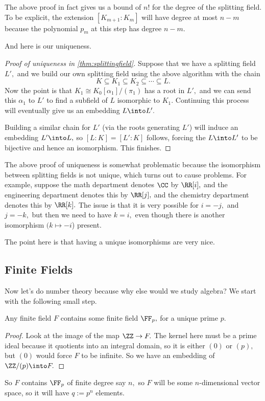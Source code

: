 \documentclass[../notes.tex]{subfiles}
\begin{document}
\begin{remark}
	The above proof in fact gives us a bound of $n!$ for the degree of the splitting field. To be explicit, the extension $[K_{m+1}:K_m]$ will have degree at most $n-m$ because the polynomial $p_m$ at this step has degree $n-m.$
\end{remark}
And here is our uniqueness.
\begin{proof}[Proof of uniqueness in \autoref{thm:splittingfield}]
	Suppose that we have a splitting field $L',$ and we build our own splitting field using the above algorithm with the chain
	\[K\subseteq K_1\subseteq K_2\subseteq\cdots\subseteq L.\]
	Now the point is that $K_1\cong K_0[\alpha_1]/(\pi_1)$ has a root in $L',$ and we can send this $\alpha_1$ to $L'$ to find a subfield of $L$ isomorphic to $K_1.$ Continuing this process will eventually give us an embedding $L\into L'.$
	
	Building a similar chain for $L'$ (via the roots generating $L'$) will induce an embedding $L'\into L,$ so $[L:K]=[L':K]$ follows, forcing the $L\into L'$ to be bijective and hence an isomorphism. This finishes.
\end{proof}
\begin{remark}
	The above proof of uniqueness is somewhat problematic because the isomorphism between splitting fields is not unique, which turns out to cause problems. For example, suppose the math department denotes $\CC$ by $\RR[i],$ and the engineering department denotes this by $\RR[j],$ and the chemistry department denotes this by $\RR[k].$ The issue is that it is very possible for $i=-j,$ and $j=-k,$ but then we need to have $k=i,$ even though there is another isomorphism $(k\mapsto-i$) present.
\end{remark}
\begin{remark}
	The point here is that having a unique isomorphisms are very nice.
\end{remark}

\subsection{Finite Fields}
Now let's do number theory because why else would we study algebra? We start with the following small step.
\begin{proposition}
	Any finite field $F$ contains some finite field $\FF_p,$ for a unique prime $p.$
\end{proposition}
\begin{proof}
	Look at the image of the map $\ZZ\to F.$ The kernel here must be a prime ideal because it quotients into an integral domain, so it is either $(0)$ or $(p),$ but $(0)$ would force $F$ to be infinite. So we have an embedding of $\ZZ/(p)\into F.$
\end{proof}
So $F$ contains $\FF_p$ of finite degree say $n,$ so $F$ will be some $n$-dimensional vector space, so it will have $q:=p^n$ elements.
\end{document}
